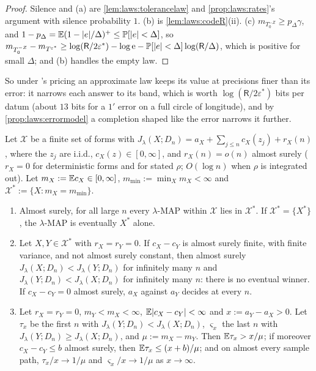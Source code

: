 \begin{proof}
Silence and (a) are \cref{lem:laws:tolerancelaw} and \cref{prop:laws:rates}'s argument with silence probability $1$. (b) is \cref{lem:laws:codeR}(ii). (c) $m_{T_0^{-Z}}\ge p_\Delta\gamma$, and $1-p_\Delta=\mathbb{E}(1-\lvert e\rvert/\Delta)^+\le\mathbb{P}[\lvert e\rvert<\Delta]$, so $m_{T_0^{-Z}}-m_{T^{\varepsilon^*}}\ge\log(\mathsf R/2\varepsilon^*)-\log\mathrm e-\mathbb{P}[\lvert e\rvert<\Delta]\log(\mathsf R/\Delta)$, which is positive for small $\Delta$; and (b) handles the empty law.
\end{proof}

So under \SAIabbr's pricing an approximate law keeps its value at precisions finer than its error: it narrows each answer to its band, which is worth $\log(\mathsf R/2\varepsilon^*)$ bits per datum (about $13$ bits for a $1'$ error on a full circle of longitude), and by \cref{prop:laws:errormodel} a completion shaped like the error narrows it further.

\begin{theorem}\label{thm:laws:as}
Let $\mathcal X$ be a finite set of forms with $J_\lambda(X;D_n)=a_X+\sum_{j\le n}c_X(z_j)+r_X(n)$, where the $z_j$ are i.i.d., $c_X(z)\in[0,\infty]$, and $r_X(n)=o(n)$ almost surely ($r_X=0$ for deterministic forms and for stated $\rho$; $O(\log n)$ when $\rho$ is integrated out). Let $m_X:=\mathbb{E} c_X\in[0,\infty]$, $m_{\min}:=\min_Xm_X<\infty$ and $\mathcal X^*:=\{X:m_X=m_{\min}\}$.
\begin{enumerate}[label=(\roman*),itemsep=1pt,topsep=2pt]
\item Almost surely, for all large $n$ every $\lambda$-MAP within $\mathcal X$ lies in $\mathcal X^*$. If $\mathcal X^*=\{X^*\}$, the $\lambda$-MAP is eventually $X^*$ alone.
\item Let $X,Y\in\mathcal X^*$ with $r_X=r_Y=0$. If $c_X-c_Y$ is almost surely finite, with finite variance, and not almost surely constant, then almost surely $J_\lambda(X;D_n)<J_\lambda(Y;D_n)$ for infinitely many $n$ and $J_\lambda(Y;D_n)<J_\lambda(X;D_n)$ for infinitely many $n$: there is no eventual winner. If $c_X-c_Y=0$ almost surely, $a_X$ against $a_Y$ decides at every $n$.
\item Let $r_X=r_Y=0$, $m_Y<m_X<\infty$, $\mathbb{E}\lvert c_X-c_Y\rvert<\infty$ and $x:=a_Y-a_X>0$. Let $\tau_x$ be the first $n$ with $J_\lambda(Y;D_n)<J_\lambda(X;D_n)$, $\varsigma_x$ the last $n$ with $J_\lambda(Y;D_n)\ge J_\lambda(X;D_n)$, and $\mu:=m_X-m_Y$. Then $\mathbb{E}\tau_x>x/\mu$; if moreover $c_X-c_Y\le b$ almost surely, then $\mathbb{E}\tau_x\le(x+b)/\mu$; and on almost every sample path, $\tau_x/x\to1/\mu$ and $\varsigma_x/x\to1/\mu$ as $x\to\infty$.
\end{enumerate}
\end{theorem}

